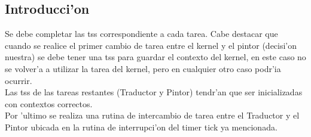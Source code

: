 \documentclass[11pt]{article}
\begin{document}
\subsection{Introducci'on}
Se debe completar las tss correspondiente a cada tarea. Cabe destacar que cuando se realice el primer cambio de tarea entre el kernel y el pintor (decisi'on nuestra) se debe tener una tss para guardar el contexto del kernel, en este caso no se volver'a a utilizar la tarea del kernel, pero en cualquier otro caso podr'ia ocurrir.\\ Las tss de las tareas restantes (Traductor y Pintor) tendr'an que ser inicializadas con contextos correctos. \\
Por 'ultimo se realiza una rutina de intercambio de tarea entre el Traductor y el Pintor ubicada en la rutina de interrupci'on del timer tick ya mencionada.
\end{document}
